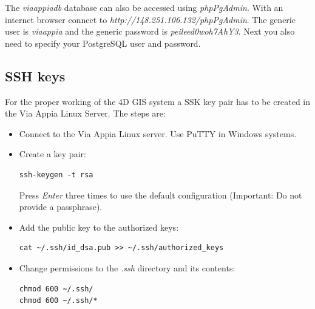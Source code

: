 \documentclass[a4paper,11pt]{article}
\begin{document}
The \textit{viaappiadb} database can also be accessed using \textit{phpPgAdmin}. With an internet browser connect to \textit{http://148.251.106.132/phpPgAdmin}. The generic user is \textit{viaappia} and the generic password is \textit{peileed0woh7AhY3}. Next you also need to specify your PostgreSQL user and password.

\subsection{SSH keys}
\label{sec:sshkeys}

For the proper working of the 4D GIS system a SSK key pair has to be created in the Via Appia Linux Server. The steps are:

\begin{itemize}
\item Connect to the Via Appia Linux server. Use PuTTY in Windows systems.
\item Create a key pair:
\begin{Verbatim}[fontfamily=courier,commandchars=\\\{\},fontsize=\footnotesize]
ssh-keygen -t rsa
\end{Verbatim}
 Press \textit{Enter} three times to use the default configuration (Important: Do not provide a passphrase).
\item Add the public key to the authorized keys:
\begin{Verbatim}[fontfamily=courier,commandchars=\\\{\},fontsize=\footnotesize]
cat ~/.ssh/id_dsa.pub >> ~/.ssh/authorized_keys
\end{Verbatim}
\item Change permissions to the \textit{.ssh} directory and its contents:
\begin{Verbatim}[fontfamily=courier,commandchars=\\\{\},fontsize=\footnotesize]
chmod 600 ~/.ssh/
chmod 600 ~/.ssh/*
\end{Verbatim}
\end{itemize}
\end{document}
